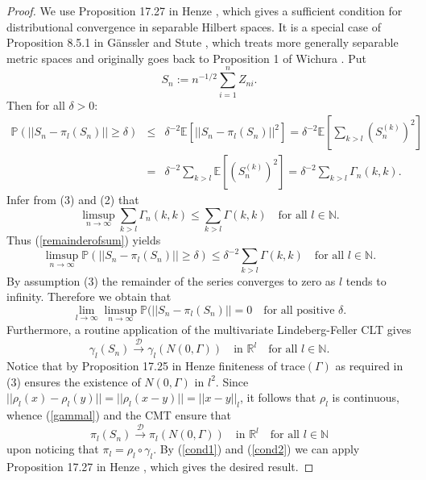 \documentclass[sn-mathphys,Numbered]{sn-jnl}%
\theoremstyle{thmstyleone}%
\theoremstyle{thmstyletwo}%
\theoremstyle{thmstylethree}%
\begin{document}
\begin{proof} We use Proposition 17.27 in Henze \cite{Henze}, which gives a sufficient condition for distributional convergence in separable
Hilbert spaces. It is a special case of Proposition 8.5.1 in G\"{a}nssler and Stute \cite{Stute}, which treats more generally separable metric spaces and originally goes back to Proposition 1 of Wichura \cite{Wichura}. Put $$S_n:=n^{-1/2}\sum_{i=1}^n Z_{ni}.$$ Then for all $\delta>0$:
\begin{eqnarray}
\mathbb{P}(||S_n-\pi_l(S_n)|| \ge \delta) &\le& \delta^{-2} \mathbb{E}[||S_n-\pi_l(S_n)||^2]=\delta^{-2} \mathbb{E}[\sum_{k > l} (S_n^{(k)})^2] \nonumber\\
&=& \delta^{-2} \sum_{k > l} \mathbb{E}[(S_n^{(k)})^2] = \delta^{-2} \sum_{k > l} \Gamma_n(k,k). \label{remainderofsum}
\end{eqnarray}
Infer from (3) and (2) that
$$
 \limsup_{n \rightarrow \infty} \sum_{k > l} \Gamma_n(k,k) \le \sum_{k > l} \Gamma(k,k) \quad \text{for all } l \in \mathbb{N}.
$$
Thus (\ref{remainderofsum}) yields
$$
 \limsup_{n \rightarrow \infty}\mathbb{P}(||S_n-\pi_l(S_n)|| \ge \delta) \le \delta^{-2} \sum_{k > l} \Gamma(k,k) \quad \text{for all } l \in \mathbb{N}.
$$
By assumption (3) the remainder of the series converges to zero as $l$ tends to infinity. Therefore we obtain that
\begin{equation} \label{cond1}
 \lim_{l \rightarrow \infty} \limsup_{n \rightarrow \infty}\mathbb{P}(||S_n-\pi_l(S_n)|| =0 \quad \text{for all positive } \delta.
\end{equation}
Furthermore, a routine application of the multivariate Lindeberg-Feller CLT gives
\begin{equation} \label{gammal}
\gamma_l(S_n) \stackrel{\mathcal{D}}{\rightarrow} \gamma_l(N(0,\Gamma)) \quad \text{in } \mathbb{R}^l \quad \text{for all } l \in \mathbb{N}.
\end{equation}
Notice that by Proposition 17.25 in Henze \cite{Henze} finiteness of trace$(\Gamma)$ as required in (3) ensures the existence of $N(0,\Gamma)$ in $l^2.$
Since $||\rho_l(x)- \rho_l(y)||=||\rho_l(x-y)||=||x-y||_l$, it follows that $\rho_l$ is continuous, whence (\ref{gammal}) and the CMT ensure that
\begin{equation} \label{cond2}
\pi_l(S_n) \stackrel{\mathcal{D}}{\rightarrow} \pi_l(N(0,\Gamma)) \quad \text{in } \mathbb{R}^l \quad \text{for all } l \in \mathbb{N}
\end{equation}
upon noticing that $\pi_l = \rho_l \circ \gamma_l$. By (\ref{cond1}) and (\ref{cond2}) we can apply Proposition 17.27 in Henze \cite{Henze}, which gives the desired result.
\end{proof}
\end{document}
